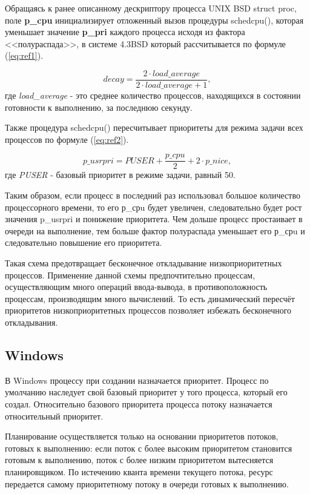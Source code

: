 Обращаясь к ранее описанному дескриптору процесса UNIX BSD struct proc, поле \textbf{p\_cpu} инициализирует отложенный вызов процедуры schedcpu(), которая уменьшает значение \textbf{p\_pri} каждого процесса исходя из фактора <<полураспада>>, в системе 4.3BSD который рассчитывается по формуле (\ref{eq:ref1}).

\begin{equation}
	\label{eq:ref1}
	decay = \frac{2 \cdot load\_average}{2 \cdot load\_average + 1} ,
\end{equation} где
\textit{load\_average} - это среднее количество процессов, находящихся в состоянии готовности к выполнению, за последнюю секунду.

Также процедура schedcpu() пересчитывает приоритеты для режима задачи всех процессов по формуле (\ref{eq:ref2}).

\begin{equation}
	\label{eq:ref2}
	p\_usrpri = PUSER + \frac{p\_cpu}{2} + 2 \cdot p\_nice ,
\end{equation}где \textit{PUSER} - базовый приоритет в режиме задачи, равный 50.

Таким образом, если процесс в последний раз использовал большое количество процессорного времени, то его р\_срu будет увеличен, следовательно будет рост значения p\_usrpri и понижение приоритета.  Чем дольше процесс простаивает в очереди на выполнение, тем больше фактор полураспада уменьшает его р\_срu и следовательно повышение его приоритета. 

Такая схема предотвращает бесконечное откладывание низкоприоритетных процессов. Применение данной схемы предпочтительно процессам, осуществляющим много операций ввода-вывода, в противоположность процессам, производящим много вычислений. То есть динамический пересчёт приоритетов низкоприоритетных процессов позволяет избежать бесконечного откладывания.


\subsection{Windows}

В Windows процессу при создании назначается приоритет. Процесс по умолчанию наследует свой базовый приоритет у того процесса, который его создал. Относительно базового приоритета процесса потоку назначается относительный приоритет. 

Планирование осуществляется только на основании приоритетов потоков, готовых к выполнению: если поток с более высоким приоритетом становится готовым к выполнению, поток с более низким приоритетом вытесняется планировщиком. По истечению кванта времени текущего потока, ресурс передается самому приоритетному потоку в очереди готовых к выполнению.

